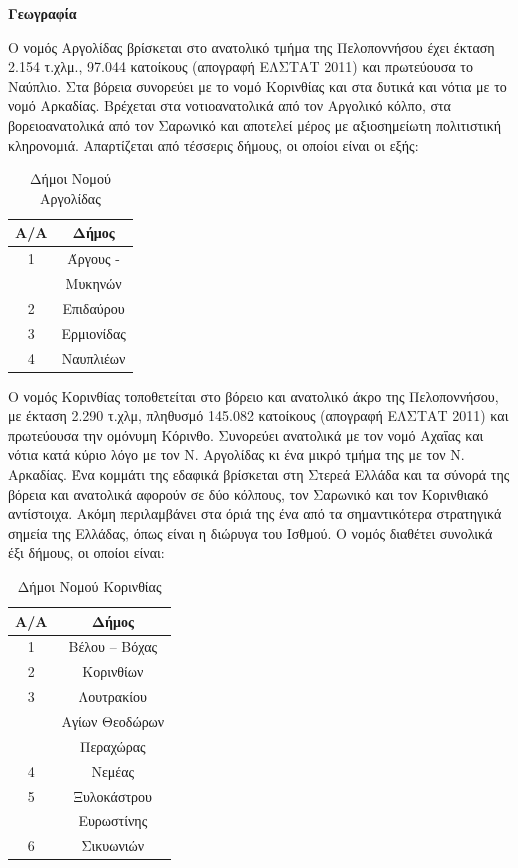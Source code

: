 \documentclass[12pt]{article}
\begin{document}
	\textbf{Γεωγραφία}
	
	Ο νομός Αργολίδας  βρίσκεται στο ανατολικό τμήμα της Πελοποννήσου έχει έκταση 2.154 τ.χλμ., 97.044 κατοίκους (απογραφή ΕΛΣΤΑΤ 2011) και πρωτεύουσα το Ναύπλιο. Στα βόρεια συνορεύει με  το νομό Κορινθίας και στα δυτικά και νότια με το νομό Αρκαδίας. Βρέχεται στα νοτιοανατολικά από τον Αργολικό κόλπο, στα βορειοανατολικά από τον Σαρωνικό και αποτελεί μέρος με αξιοσημείωτη πολιτιστική κληρονομιά. Απαρτίζεται από τέσσερις δήμους, οι οποίοι είναι οι εξής:
	
	\begin{table}[H]
		\centering
		\label{my-label}
		\begin{tabular}{|c|c|}
			\hline
			\textbf{A/A} & \textbf{Δήμος}   \\ \hline
			1            & Άργους - \\ 
						& Μυκηνών \\ \hline
			2            & Επιδαύρου        \\ \hline
			3            & Ερμιονίδας       \\ \hline
			4            & Ναυπλιέων       \\ \hline
		\end{tabular}
	\caption{Δήμοι Νομού Αργολίδας}
	\end{table}
	
	Ο νομός Κορινθίας τοποθετείται στο βόρειο και ανατολικό άκρο της Πελοποννήσου, με έκταση 2.290 τ.χλμ, πληθυσμό 145.082 κατοίκους (απογραφή ΕΛΣΤΑΤ 2011) και πρωτεύουσα την ομόνυμη Κόρινθο. Συνορεύει ανατολικά με τον νομό Αχαΐας και νότια κατά κύριο λόγο με τον Ν. Αργολίδας κι ένα μικρό τμήμα της με τον Ν. Αρκαδίας. Ένα κομμάτι της εδαφικά βρίσκεται στη Στερεά Ελλάδα και τα σύνορά της βόρεια και ανατολικά αφορούν σε δύο κόλπους, τον Σαρωνικό και τον Κορινθιακό αντίστοιχα. Ακόμη περιλαμβάνει στα όριά της ένα από τα σημαντικότερα στρατηγικά σημεία της Ελλάδας, όπως είναι η διώρυγα του Ισθμού. Ο νομός διαθέτει συνολικά έξι δήμους, οι οποίοι είναι:
	
	\begin{table}[H]
		\centering
		\label{my-label}
		\begin{tabular}{|c|c|}
			\hline
			\textbf{A/A} & \textbf{Δήμος}   \\ \hline
			1            & Βέλου – Βόχας \\ \hline
			2            & Κορινθίων        \\ \hline
			3            & Λουτρακίου \\
						& Αγίων Θεοδώρων \\
						& Περαχώρας      \\ \hline
			4            & Νεμέας       \\  \hline
			5			& Ξυλοκάστρου \\
						& Ευρωστίνης \\  \hline
			6			& Σικυωνιών \\ \hline
		\end{tabular}
		\caption{Δήμοι Νομού Κορινθίας}
	\end{table}
	
\end{document}
